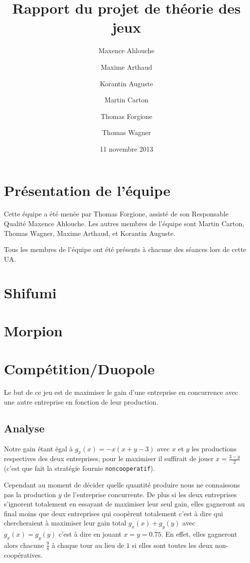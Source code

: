 \documentclass{scrartcl}
\begin{document}
\title{Rapport du projet de théorie des jeux}
\author{Maxence Ahlouche \and Maxime Arthaud \and Korantin Auguste
          \and Martin Carton \and Thomas Forgione \and Thomas Wagner}
\date{11 novembre 2013}
\maketitle
\tableofcontents
\lstlistoflistings
\newpage

\section{Présentation de l'équipe}
  Cette équipe a été menée par Thomas Forgione, assisté de son Responsable
  Qualité Maxence Ahlouche. Les autres membres de l'équipe sont Martin Carton,
  Thomas Wagner, Maxime Arthaud, et Korantin Auguste.

  Tous les membres de l'équipe ont été présents à chacune des séances lors de
  cette UA.

\section{Shifumi}
\section{Morpion}
\section{Compétition/Duopole}
  Le but de ce jeu est de maximiser le gain d'une entreprise en concurrence
  avec une autre entreprise en fonction de leur production.

  \subsection{Analyse}
    Notre gain étant égal à $g_x(x) = -x(x+y-3)$ avec $x$ et $y$ les
    productions respectives des deux entreprises, pour le maximiser il
    suffirait de jouer $x=\frac{3-y}{2}$ (c'est que fait la stratégie fournie
    \verb+noncooperatif+).
    
    Cependant au moment de décider quelle quantité produire nous ne connaissons
    pas la production $y$ de l'entreprise concurrente. De plus si les deux
    entreprises s'ignorent totalement en essayant de maximiser leur seul gain,
    elles gagneront au final moins que deux entreprises qui coopèrent
    totalement c'est à dire qui chercheraient à maximiser leur gain total
    $g_x(x)+g_y(y)$ avec $g_x(x) = g_y(y)$ c'est à dire en jouant $x=y=0.75$.
    En effet, elles gagneront alors chacune $\frac 9 8$ à chaque tour au lieu
    de $1$ si elles sont toutes les deux non-coopératives.
\end{document}
